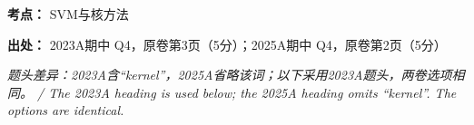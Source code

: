 \textbf{考点：} SVM与核方法


\textbf{出处：} 2023A期中 Q4，原卷第3页（5分）；2025A期中 Q4，原卷第2页（5分）


\emph{题头差异：2023A含“kernel”，2025A省略该词；以下采用2023A题头，两卷选项相同。 / The 2023A heading is used below; the 2025A heading omits “kernel”. The options are identical.}
